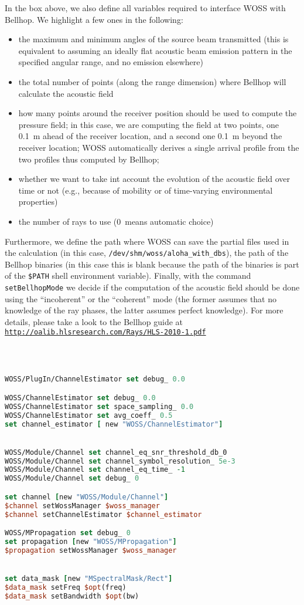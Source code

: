 \documentclass[11pt]{article}
\begin{document}
In the box above, we also define all variables required to interface WOSS with Bellhop. We highlight a few ones in the following:
\begin{itemize}
    \item the maximum and minimum angles of the source beam transmitted (this is equivalent to assuming an ideally flat acoustic beam emission pattern in the specified angular range, and no emission elsewhere)
    \item the total number of points (along the range dimension) where Bellhop will calculate the acoustic field
    \item how many points around the receiver position should be used to compute the pressure field; in this case, we are computing the field at two points, one 0.1~m ahead of the receiver location, and a second one 0.1~m beyond the receiver location; WOSS automatically derives a single arrival profile from the two profiles thus computed by Bellhop;
    \item whether we want to take int account the evolution of the acoustic field over time or not (e.g., because of mobility or of time-varying environmental properties)
    \item the number of rays to use (0~means automatic choice)
\end{itemize}

Furthermore, we define the path where WOSS can save the partial files used in the calculation (in this case, {\tt /dev/shm/woss/aloha\_with\_dbs}), the path of the Bellhop binaries (in this case this is blank because the path of the binaries is part of the {\tt \$PATH} shell environment variable).
Finally, with the command {\tt setBellhopMode} we decide if the computation of the acoustic field should be done using the ``incoherent'' or the ``coherent'' mode (the former assumes that no knowledge of the ray phases, the latter assumes perfect knowledge). For more details, please take a look to the Bellhop guide at {\tt \url{http://oalib.hlsresearch.com/Rays/HLS-2010-1.pdf}}\\ \ \\

{\scriptsize\tt
\begin{lstlisting}[language=tcl]
WOSS/PlugIn/ChannelEstimator set debug_ 0.0

WOSS/ChannelEstimator set debug_ 0.0
WOSS/ChannelEstimator set space_sampling_ 0.0
WOSS/ChannelEstimator set avg_coeff_ 0.5
set channel_estimator [ new "WOSS/ChannelEstimator"]


WOSS/Module/Channel set channel_eq_snr_threshold_db_0
WOSS/Module/Channel set channel_symbol_resolution_ 5e-3
WOSS/Module/Channel set channel_eq_time_ -1
WOSS/Module/Channel set debug_ 0

set channel [new "WOSS/Module/Channel"]
$channel setWossManager $woss_manager
$channel setChannelEstimator $channel_estimator

WOSS/MPropagation set debug_ 0
set propagation [new "WOSS/MPropagation"]
$propagation setWossManager $woss_manager


set data_mask [new "MSpectralMask/Rect"]
$data_mask setFreq $opt(freq)
$data_mask setBandwidth $opt(bw)
\end{lstlisting}
}
\end{document}
